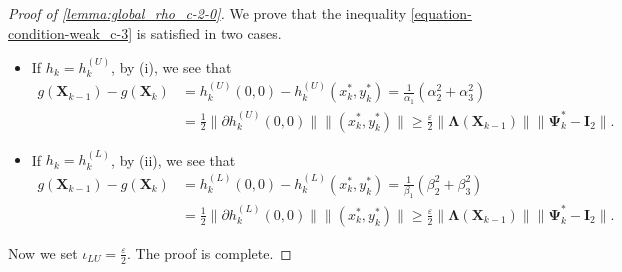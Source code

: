 \documentclass[final,onefignum,onetabnum]{siamart190516}
\newcommand{\matr}[1]{\boldsymbol{#1}}
\newcommand{\Utwo}{\Psi}
\begin{document}
\begin{proof}[Proof of \cref{lemma:global_rho_c-2-0}]
We prove that the inequality \cref{equation-condition-weak_c-3} is satisfied in two cases.
\begin{itemize}
\item If $h_k = h^{(U)}_{k}$, by (i), we see that
\begin{align*}
g(\matr{X}_{k-1})-g(\matr{X}_{k})
&=h^{(U)}_{k}(0,0)-h^{(U)}_{k}(x_k^*,y_k^*) = \frac{1}{\alpha_{1}}(\alpha_{2}^2+\alpha_{3}^2)\\
&=\frac{1}{2}\|\partial h^{(U)}_{k}(0,0)\|\|(x_k^{*},y_k^{*})\|
\geq\frac{\varepsilon}{2}\|\matr{\Lambda}(\matr{X}_{k-1})\|\|\matr{\Utwo}^{*}_{k}-\matr{I}_{2}\|. 
\end{align*}
\item If $h_k = h^{(L)}_{k}$, by (ii), we see that
\begin{align*}
g(\matr{X}_{k-1})-g(\matr{X}_{k})
&=h^{(L)}_{k}(0,0)-h^{(L)}_{k}(x_k^*,y_k^*) = \frac{1}{\beta_{1}}(\beta_{2}^2+\beta_{3}^2)\\
&=\frac{1}{2}\|\partial h^{(L)}_{k}(0,0)\|\|(x_k^{*},y_k^{*})\|
\geq\frac{\varepsilon}{2}\|\matr{\Lambda}(\matr{X}_{k-1})\|\|\matr{\Utwo}^{*}_{k}-\matr{I}_{2}\|. 
\end{align*}
\end{itemize}
Now we set $\iota_{LU}=\frac{\varepsilon}{2}$. The proof is complete.
\end{proof}
\end{document}
